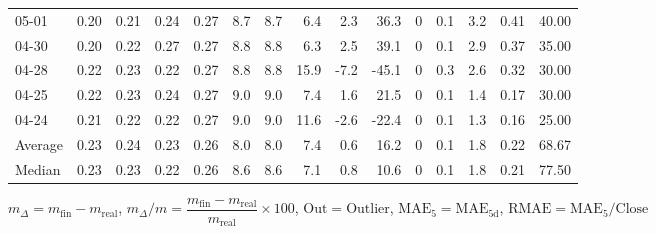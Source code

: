 \begin{threeparttable}
{\begin{tabular}{lrrrrrrrrrrrrrr}
  05-01 &          0.20 &          0.21 &          0.24 &        0.27 &                 8.7 &                8.7 &                 6.4 &        2.3 &         36.3 &              0 &                 0.1 &              3.2 &            0.41 &                  40.00 \\
  04-30 &          0.20 &          0.22 &          0.27 &        0.27 &                 8.8 &                8.8 &                 6.3 &        2.5 &         39.1 &              0 &                 0.1 &              2.9 &            0.37 &                  35.00 \\
  04-28 &          0.22 &          0.23 &          0.22 &        0.27 &                 8.8 &                8.8 &                15.9 &       -7.2 &        -45.1 &              0 &                 0.3 &              2.6 &            0.32 &                  30.00 \\
  04-25 &          0.22 &          0.23 &          0.24 &        0.27 &                 9.0 &                9.0 &                 7.4 &        1.6 &         21.5 &              0 &                 0.1 &              1.4 &            0.17 &                  30.00 \\
  04-24 &          0.21 &          0.22 &          0.22 &        0.27 &                 9.0 &                9.0 &                11.6 &       -2.6 &        -22.4 &              0 &                 0.1 &              1.3 &            0.16 &                  25.00 \\
Average &          0.23 &          0.24 &          0.23 &        0.26 &                 8.0 &                8.0 &                 7.4 &        0.6 &         16.2 &              0 &                 0.1 &              1.8 &            0.22 &                  68.67 \\
 Median &          0.23 &          0.23 &          0.22 &        0.26 &                 8.6 &                8.6 &                 7.1 &        0.8 &         10.6 &              0 &                 0.1 &              1.8 &            0.21 &                  77.50 \\
\bottomrule
\end{tabular}
}
\begin{tablenotes}\footnotesize
\item $m_\Delta=m_{\text{fin}}-m_{\text{real}}$,
$m_\Delta/m=\dfrac{m_{\text{fin}}-m_{\text{real}}}{m_{\text{real}}}\times100$,
$\mathrm{Out}=\text{Outlier}$,
$\mathrm{MAE}_5=\mathrm{MAE}_{5\text{d}}$,
$\mathrm{RMAE}=\mathrm{MAE}_5/\text{Close}$
\end{tablenotes}
\end{threeparttable}
\endgroup

